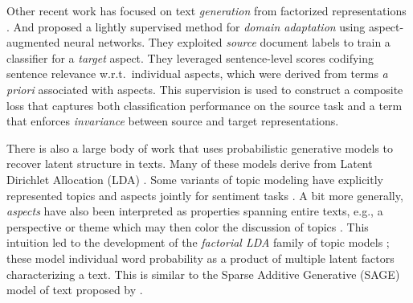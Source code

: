 \documentclass[11pt,a4paper]{article}
\begin{document}

Other recent work has focused on text \emph{generation} from factorized representations \cite{larsson2017disentangled}. And  proposed a lightly supervised method for \emph{domain adaptation} using aspect-augmented neural networks. They exploited \emph{source} document labels to train a classifier for a \emph{target} aspect. They leveraged sentence-level scores codifying sentence relevance w.r.t.~individual aspects, which were derived from terms \emph{a priori} associated with aspects. This supervision is used to construct a composite loss that captures both classification performance on the source task and a term that enforces \emph{invariance} between source and target representations.



There is also a large body of work that uses probabilistic generative models to recover latent structure in texts. Many of these models derive from Latent Dirichlet Allocation (LDA) \cite{blei2003latent}. Some variants of topic modeling have explicitly represented topics and aspects jointly for sentiment tasks \cite{brody2010unsupervised,sauper2010incorporating,sauper2011content,mukherjee2012aspect,sauper2013automatic,kim2013hierarchical}. A bit more generally, \emph{aspects} have also been interpreted as properties spanning entire texts, e.g., a perspective or theme which may then color the discussion of topics \cite{paul2010two}. This intuition led to the development of the \emph{factorial LDA} family of topic models \cite{paul2012factorial,wallace2014large}; these model individual word probability as a product of multiple latent factors characterizing a text. This is similar to the Sparse Additive Generative (SAGE) model of text proposed by .%
\end{document}
